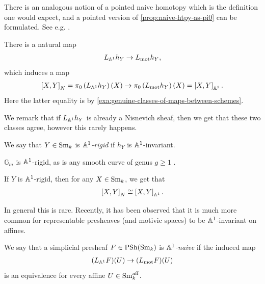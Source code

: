 \documentclass[11pt,openany]{book}
\providecommand{\aff}{\mathrm{aff}}
\begin{document}
\begin{remark} There is an analogous notion of a pointed naive homotopy which is the definition one would expect, and a pointed version of \autoref{prop:naive-htpy-as-pi0} can be formulated. See e.g. \cite[Appendix~A]{BHQW}.
\end{remark}

There is a natural map
\begin{align*}
    L_{\mathbb{A}^1} h_Y \to L_{\mathrm{mot}} h_Y,
\end{align*}
which induces a map
\begin{align*}
    \left[ X,Y \right]_N = \pi_0 \left( L_{\mathbb{A}^1}h_Y \right)(X) \to \pi_0 \left( L_{\mathrm{mot}} h_Y \right)(X) = \left[ X,Y \right]_{\mathbb{A}^1}.
\end{align*}
Here the latter equality is by \autoref{exa:genuine-classes-of-maps-between-schemes}.

We remark that if $L_{\mathbb{A}^1}h_Y$ is already a Nisnevich sheaf, then we get that these two classes agree, however this rarely happens.

\begin{definition}[{\cite[\S3.2.4]{MV}}]
We say that $Y \in \mathrm{Sm}_k$ is \textit{$\mathbb{A}^1$-rigid} if $h_Y$ is $\mathbb{A}^1$-invariant.
\end{definition}

\begin{example} $\mathbb{G}_m$ is $\mathbb{A}^1$-rigid, as is any smooth curve of genus $g\ge 1$ \cite[\S3.2.4]{MV}.
\end{example}

\begin{proposition} If $Y$ is $\mathbb{A}^1$-rigid, then for any $X \in \mathrm{Sm}_k$, we get that
\begin{align*}
    \left[ X,Y \right]_N \cong \left[ X,Y \right]_{\mathbb{A}^1}.
\end{align*}
\end{proposition}

In general this is rare. Recently, it has been observed that it is much more common for representable presheaves (and motivic spaces) to be $\mathbb{A}^1$-invariant on affines.

\begin{definition}\label{def:a1-naive}
We say that a simplicial presheaf $F \in \mathrm{PSh}(\mathrm{Sm}_k)$ is \textit{$\mathbb{A}^1$-naive} if the induced map
\begin{align*}
    (L_{\mathbb{A}^1}F)(U) \to (L_{\mathrm{mot}} F)(U)
\end{align*}
is an equivalence for every affine $U \in \Sm_k^\aff$.
\end{definition}
\end{document}
